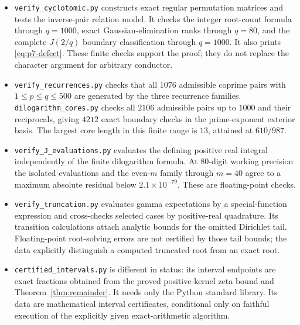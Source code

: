 \documentclass[11pt]{article}
\numberwithin{equation}{section}
\theoremstyle{definition}
\theoremstyle{remark}
\begin{document}
\begin{itemize}
\item \texttt{verify\_cyclotomic.py} constructs exact regular
      permutation matrices and tests the inverse-pair relation
      model. It checks the integer root-count formula through
      $q=1000$, exact Gaussian-elimination ranks through $q=80$,
      and the complete $J(2/q)$ boundary classification through
      $q=1000$. It also prints \eqref{eq:p7-defect}.
      These finite checks support the proof; they do not replace
      the character argument for arbitrary conductor.

\item \texttt{verify\_recurrences.py} checks that all $1076$
      admissible coprime pairs with $1\le p\le q\le500$ are
      generated by the three recurrence families.
      \texttt{dilogarithm\_cores.py} checks all $2106$ admissible
      pairs up to $1000$ and their reciprocals, giving $4212$
      exact boundary checks in the prime-exponent exterior basis.
      The largest core length in this finite range is $13$,
      attained at $610/987$.

\item \texttt{verify\_J\_evaluations.py} evaluates the defining
      positive real integral independently of the finite
      dilogarithm formula. At 80-digit working precision the
      isolated evaluations and the even-$m$ family through
      $m=40$ agree to a maximum absolute residual below
      $2.1\times10^{-79}$. These are floating-point checks.

\item \texttt{verify\_truncation.py} evaluates gamma expectations
      by a special-function expression and cross-checks selected
      cases by positive-real quadrature. Its transition
      calculations attach analytic bounds for the omitted
      Dirichlet tail. Floating-point root-solving errors are
      not certified by those tail bounds; the data explicitly
      distinguish a computed truncated root from an exact root.

\item \texttt{certified\_intervals.py} is different in status:
      its interval endpoints are exact fractions obtained from
      the proved positive-kernel zeta bound and
      Theorem~\ref{thm:remainder}. It needs only the Python
      standard library. Its data are mathematical interval
      certificates, conditional only on faithful execution of
      the explicitly given exact-arithmetic algorithm.
\end{itemize}
\end{document}
